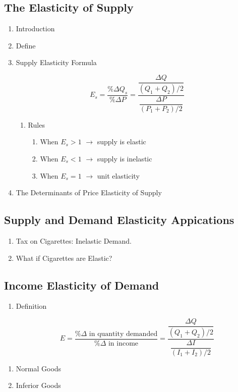 \subsection{The Elasticity of Supply}
\begin{enumerate}[label = \textbf{(\Alph*)}, itemsep = 1em]
	\item Introduction
	\item Define
	\item Supply Elasticity Formula

		\[ E_s = \dfrac{\%\Delta Q_s}{ \%\Delta P} = \dfrac{\dfrac{\Delta Q}{(Q_1 + Q_2)/2}}{\dfrac{\Delta P}{(P_1 + P_2)/2}}\]

		\begin{enumerate}[label = \textbf{(\arabic*)}, itemsep = 1ex]
			\item Rules
				\begin{enumerate}[label = ---, itemsep = 1ex]
					\item When $E_s > 1$ $\longrightarrow$ supply is elastic
					\item When $E_s < 1$ $\longrightarrow$ supply is inelastic	
					\item When $E_s = 1$ $\longrightarrow$ unit elasticity
				\end{enumerate}
		\end{enumerate}

			\item The Determinants of Price Elasticity of Supply
\end{enumerate}

\subsection{Supply and Demand Elasticity Appications}
\begin{enumerate}[label = \textbf{(\Alph*)}, itemsep = 1em]
	\item Tax on Cigarettes: Inelastic Demand.
	\item What if Cigarettes are Elastic?
\end{enumerate}

\subsection{Income Elasticity of Demand}
\begin{enumerate}[label = \textbf{(\Alph*)}, itemsep = 1em]
	\item Definition

		\[ E = \dfrac{\%\Delta \text{ in quantity demanded}}{ \%\Delta \text{ in income}} = \dfrac{\dfrac{\Delta Q}{(Q_1 + Q_2)/2}}{\dfrac{\Delta I}{(I_1 + I_2)/2}}\]

\end{enumerate}
\begin{enumerate}[label = \textbf{(\arabic*)}, itemsep = 1em]
	\item Normal Goods

	\item Inferior Goods
	
\end{enumerate}
